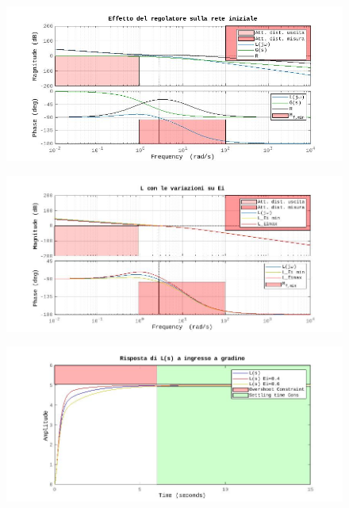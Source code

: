 \documentclass[a4paper,12pt,italian]{article}
\begin{document}
\begin{figure}[h!]
    \begin{center}
        \includegraphics[scale=0.6]{img/bode_GG_RR_LL.jpg}
    \end{center}
\end{figure}

\begin{figure}[h!]
    \begin{center}
        \includegraphics[scale=0.58]{img/bode_LL_ei.jpg}
    \end{center}
\end{figure}

\newpage

\begin{figure}[h!]
    \begin{center}
        \includegraphics[scale=0.58]{img/step_LL_ei.jpg}
    \end{center}
\end{figure}
\end{document}
